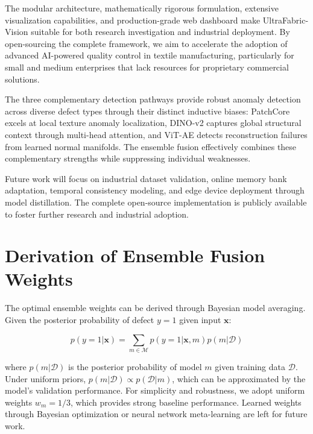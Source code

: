 \documentclass[journal]{IEEEtran}
\begin{document}
The modular architecture, mathematically rigorous formulation, extensive visualization capabilities, and production-grade web dashboard make UltraFabric-Vision suitable for both research investigation and industrial deployment. By open-sourcing the complete framework, we aim to accelerate the adoption of advanced AI-powered quality control in textile manufacturing, particularly for small and medium enterprises that lack resources for proprietary commercial solutions.

The three complementary detection pathways provide robust anomaly detection across diverse defect types through their distinct inductive biases: PatchCore excels at local texture anomaly localization, DINO-v2 captures global structural context through multi-head attention, and ViT-AE detects reconstruction failures from learned normal manifolds. The ensemble fusion effectively combines these complementary strengths while suppressing individual weaknesses.

Future work will focus on industrial dataset validation, online memory bank adaptation, temporal consistency modeling, and edge device deployment through model distillation. The complete open-source implementation is publicly available to foster further research and industrial adoption.

\appendices

\section{Derivation of Ensemble Fusion Weights}
\label{apx:weights}

The optimal ensemble weights can be derived through Bayesian model averaging. Given the posterior probability of defect $y=1$ given input $\mathbf{x}$:

\begin{equation}
    p(y=1|\mathbf{x}) = \sum_{m \in \mathcal{M}} p(y=1|\mathbf{x}, m) p(m|\mathcal{D})
    \label{eq:bayes_ensemble}
\end{equation}

where $p(m|\mathcal{D})$ is the posterior probability of model $m$ given training data $\mathcal{D}$. Under uniform priors, $p(m|\mathcal{D}) \propto p(\mathcal{D}|m)$, which can be approximated by the model's validation performance. For simplicity and robustness, we adopt uniform weights $w_m = 1/3$, which provides strong baseline performance. Learned weights through Bayesian optimization or neural network meta-learning are left for future work.
\end{document}
